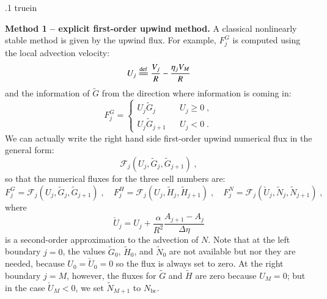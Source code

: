 \documentclass{amsart}
\theoremstyle{definition}
\theoremstyle{remark}
\numberwithin{equation}{section}
\numberwithin{figure}{section}
\newcommand{\eqdef}{\stackrel{\mathrm{def}}{=\joinrel=}}
\begin{document}
\vglue .1 truein

\noindent
{\bf Method 1 -- explicit first-order upwind method.}
A classical nonlinearly stable method is given by the upwind flux.
For example, $F_j^G$ is computed using the local advection velocity:
\begin{equation}\label{eq:num_adv_u_gh}
U_j \eqdef \frac{V_j}{R}-\frac{\eta_jV_M}{R}
\end{equation}
and the information of $\tilde{G}$ from the direction where information is coming in:
\begin{equation}\label{eq:num_flux_upw_g}
F_j^G = \left\{\begin{array}{lcl}
U_j\tilde{G}_j & & U_j\ge0\;,\\
U_j\tilde{G}_{j+1} & & U_j<0\;.
\end{array}\right.
\end{equation}
We can actually write the right hand side first-order upwind numerical flux in the general form:
\begin{equation}\label{eq:num_flux_upw}
\mathcal{F}_j(U_j,\tilde{G}_j,\tilde{G}_{j+1})\;,
\end{equation}
so that the numerical fluxes for the three cell numbers are:
\begin{displaymath}
F_j^G = \mathcal{F}_j(U_j,\tilde{G}_j,\tilde{G}_{j+1})\;,\quad
F_j^H = \mathcal{F}_j(U_j,\tilde{H}_j,\tilde{H}_{j+1})\;,\quad
F_j^N = \mathcal{F}_j(\check{U}_j,\tilde{N}_j,\tilde{N}_{j+1})\;,
\end{displaymath}
where
\begin{equation}\label{eq:num_adv_u_n}
\check{U}_j = U_j + \frac{\alpha}{R^2}\frac{A_{j+1}-A_j}{\Delta\eta}
\end{equation}
is a second-order approximation to the advection of $N$.
Note that at the left boundary $j=0$, the values $\tilde{G}_0$, $\tilde{H}_0$, and $\tilde{N}_0$ are not available but nor they are needed, because $U_0=\check{U}_0=0$ so the flux is always set to zero.
At the right boundary $j=M$, however, the fluxes for $\tilde{G}$ and $\tilde{H}$ are zero because $U_M=0$; but in the case $\check{U}_M<0$, we set $\tilde{N}_{M+1}$ to $N_{\textrm{bc}}$.
\end{document}
